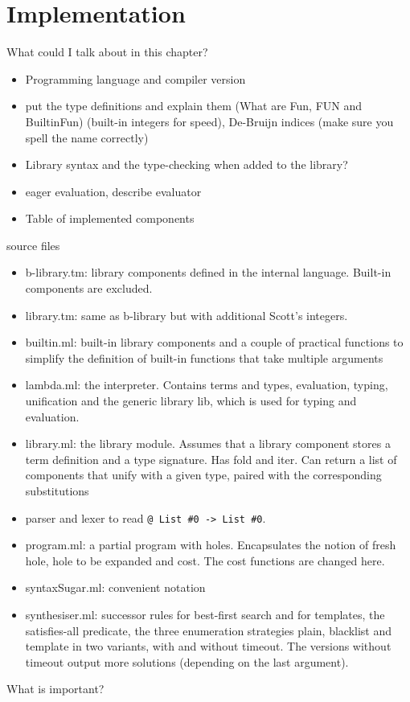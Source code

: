 \chapter{Implementation} \label{ch:implementation}

What could I talk about in this chapter?
\begin{itemize}
\item Programming language and compiler version
\item put the type definitions and explain them (What are Fun, FUN and BuiltinFun) (built-in integers for speed), De-Bruijn indices (make sure you spell the name correctly)
\item Library syntax and the type-checking when added to the library?
\item eager evaluation, describe evaluator
\item Table of implemented components
\end{itemize}


source files
\begin{itemize}
\item b-library.tm: library components defined in the internal language. Built-in components are excluded.
\item library.tm: same as b-library but with additional Scott's integers.
\item builtin.ml: built-in library components and a couple of practical functions to simplify the definition of built-in functions that take multiple arguments
\item lambda.ml: the interpreter. Contains terms and types, evaluation, typing, unification and the generic library lib, which is used for typing and evaluation.
\item library.ml: the library module. Assumes that a library component stores a term definition and a type signature. Has fold and iter. Can return a list of components that unify with a given type, paired with the corresponding substitutions
\item parser and lexer to read \lstinline!@ List #0 -> List #0!.
\item program.ml: a partial program with holes. Encapsulates the notion of fresh hole, hole to be expanded and cost. The cost functions are changed here.
\item syntaxSugar.ml: convenient notation
\item synthesiser.ml: successor rules for best-first search and for templates, the satisfies-all predicate, the three enumeration strategies plain, blacklist and template in two variants, with and without timeout. The versions without timeout output more solutions (depending on the last argument).
\end{itemize}

What is important?





